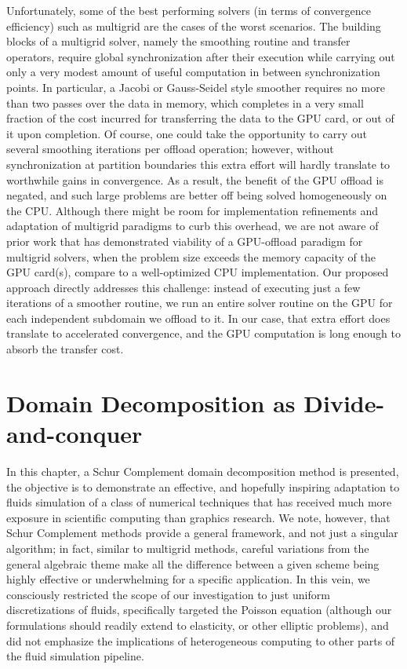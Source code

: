 Unfortunately, some of the best performing solvers (in terms of convergence efficiency) such as multigrid are the cases of the worst scenarios. The building blocks of a multigrid
solver, namely the smoothing routine and transfer operators, require global synchronization after their execution while carrying out only a very modest amount of useful computation
in between synchronization points. In particular, a Jacobi or Gauss-Seidel style smoother requires no more than two passes over the data in memory, which completes in a very small
fraction of the cost incurred for transferring the data to the GPU card, or out of it upon completion. Of course, one could take the opportunity to carry out several smoothing
iterations per offload operation; however, without synchronization at partition boundaries this extra effort will hardly translate to worthwhile gains in convergence. As a result,
the benefit of the GPU offload is negated, and such large problems are better off being solved homogeneously on the CPU. Although there might be room for implementation refinements
and adaptation of multigrid paradigms to curb this overhead, we are not aware of prior work that has demonstrated viability of a GPU-offload paradigm for multigrid solvers, when
the problem size exceeds the memory capacity of the GPU card(s), compare to a well-optimized CPU implementation. Our proposed approach directly addresses this challenge: instead of
executing just a few iterations of a smoother routine, we run an entire solver routine on the GPU for each independent subdomain we offload to it. In our case, that extra effort
does translate to accelerated convergence, and the GPU computation is long enough to absorb the transfer cost.
\section{Domain Decomposition as Divide-and-conquer}
In this chapter, a Schur Complement domain decomposition method is presented, the objective is to demonstrate an effective, and hopefully inspiring adaptation to fluids simulation of a class of numerical techniques that has received much more exposure in scientific computing than graphics research. We note, however, that Schur Complement methods provide a general framework, and not just a singular algorithm; in fact, similar to multigrid methods, careful variations from the general algebraic theme make all the difference between a given scheme being highly effective or underwhelming for a specific application. In this vein, we consciously restricted the scope of our investigation to just uniform discretizations of fluids, specifically targeted the Poisson equation (although our formulations should readily extend to elasticity, or other elliptic problems), and did not emphasize the implications of heterogeneous computing to other parts of the fluid simulation pipeline.

